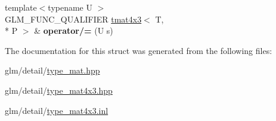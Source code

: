 \begin{DoxyCompactItemize}
\item 
\hypertarget{structglm_1_1tmat4x3_ab1383b67bc01f049a43804b2253384b9}{{\footnotesize template$<$typename U $>$ }\\G\-L\-M\-\_\-\-F\-U\-N\-C\-\_\-\-Q\-U\-A\-L\-I\-F\-I\-E\-R \hyperlink{structglm_1_1tmat4x3}{tmat4x3}$<$ T, \\*
P $>$ \& {\bfseries operator/=} (U s)}\label{structglm_1_1tmat4x3_ab1383b67bc01f049a43804b2253384b9}

\end{DoxyCompactItemize}


The documentation for this struct was generated from the following files\-:\begin{DoxyCompactItemize}
\item 
glm/detail/\hyperlink{type__mat_8hpp}{type\-\_\-mat.\-hpp}\item 
glm/detail/\hyperlink{type__mat4x3_8hpp}{type\-\_\-mat4x3.\-hpp}\item 
glm/detail/\hyperlink{type__mat4x3_8inl}{type\-\_\-mat4x3.\-inl}\end{DoxyCompactItemize}
